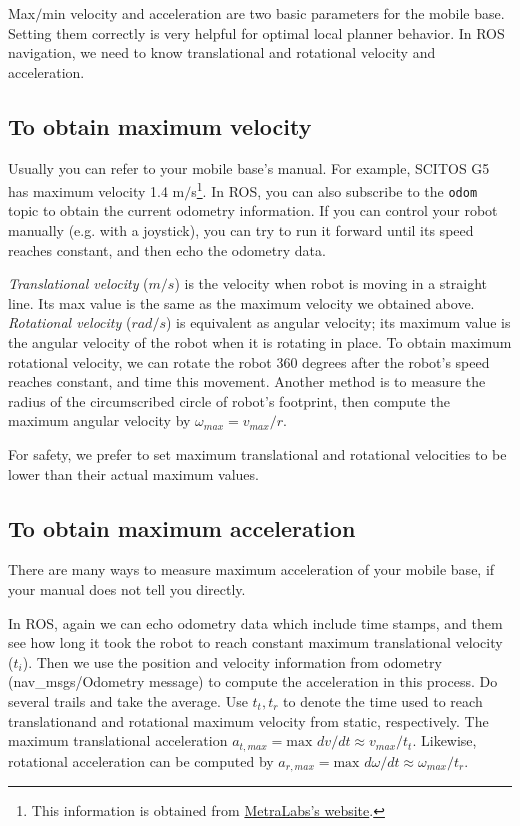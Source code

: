 \documentclass[12pt]{article}
\begin{document}
\noindent Max$/$min velocity and acceleration are two basic parameters for the mobile base. Setting them correctly is very helpful for optimal local planner behavior. In ROS navigation, we need to know translational and rotational velocity and acceleration.

\subsection{To obtain maximum velocity}
Usually you can refer to your mobile base's manual. For example, SCITOS G5 has maximum velocity 1.4 m$/$s\footnote{This information is obtained from \href{http://www.metralabs.com/en/research}{MetraLabs's website}.}. In ROS, you can also subscribe to the \texttt{odom} topic to obtain the current odometry information. If you can control your robot manually (e.g. with a joystick), you can try to run it forward until its
speed reaches constant, and then echo the odometry data.

\textit{Translational velocity} ($m/s$) is the velocity when robot is moving in a straight line. Its max value is the same as the maximum velocity we obtained above. \textit{Rotational velocity} ($rad/s$) is equivalent as angular velocity; its maximum value is the angular velocity of the robot when it is rotating in place. To obtain maximum rotational velocity, we can rotate the robot 360 degrees after the robot's speed reaches constant, and time this movement. Another method is to measure the radius of the circumscribed circle of robot's footprint, then compute the maximum angular velocity by $\omega_{max}=v_{max}/r$.

For safety, we prefer to set maximum translational and rotational velocities to be lower than their actual maximum values.

\subsection{To obtain maximum acceleration}
There are many ways to measure maximum acceleration of your mobile base, if your manual does not tell you directly. 

In ROS, again we can echo odometry data which include time stamps, and them see how long it took the robot to reach constant maximum translational velocity ($t_{i}$). Then we use the position and velocity information from odometry (nav\_msgs/Odometry message) to compute the acceleration in this process. Do several trails and take the average. Use $t_t, t_r$ to denote the time used to reach translationand and rotational maximum velocity from static, respectively. The maximum translational acceleration $a_{t,max}=\text{max }dv / dt\approx v_{max}/t_t$. Likewise, rotational acceleration can be computed by $a_{r,max}=\text{max }d\omega / dt\approx \omega_{max}/t_r$.
\end{document}
